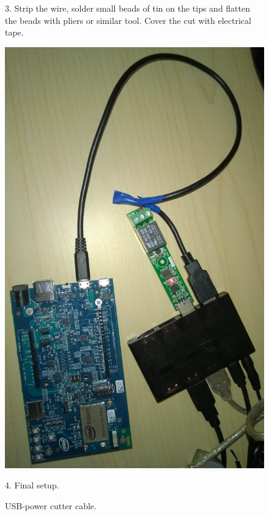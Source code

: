 \documentclass[a4paper,11pt]{article}
\begin{document}
\begin{figure}
\begin{minipage}[c][0.5\textheight][t]{0.49\textwidth}
	3. Strip the wire, solder small beads of tin on the tips and    flatten the beads with pliers or similar tool.
	Cover the cut with electrical tape.
	\end{minipage}
	\begin{minipage}[c][0.5\textheight][t]{0.49\textwidth}
	\centering
	\includegraphics[height=0.35\textheight]{edisonwire4.jpg}
	
	4. Final setup.
	\end{minipage}
	\caption{USB-power cutter cable.}
	\label{fig:usbpower}
\end{figure}

\newpage
\end{document}
